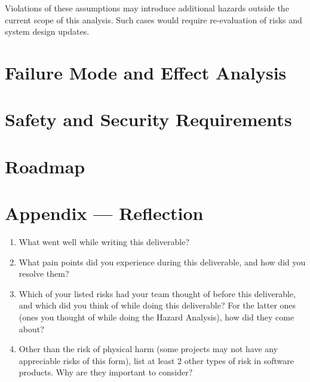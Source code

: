 \documentclass{article}
\begin{document}
Violations of these assumptions may introduce additional hazards outside
the current scope of this analysis. Such cases would require
re-evaluation of risks and system design updates.

\section{Failure Mode and Effect Analysis}


\section{Safety and Security Requirements}


\section{Roadmap}


\newpage{}

\section*{Appendix --- Reflection}




\begin{enumerate}
  \item What went well while writing this deliverable?
  \item What pain points did you experience during this deliverable, and how
    did you resolve them?
  \item Which of your listed risks had your team thought of before this
    deliverable, and which did you think of while doing this deliverable? For
    the latter ones (ones you thought of while doing the Hazard Analysis), how
    did they come about?
  \item Other than the risk of physical harm (some projects may not have any
    appreciable risks of this form), list at least 2 other types of risk in
    software products. Why are they important to consider?
\end{enumerate}
\end{document}

